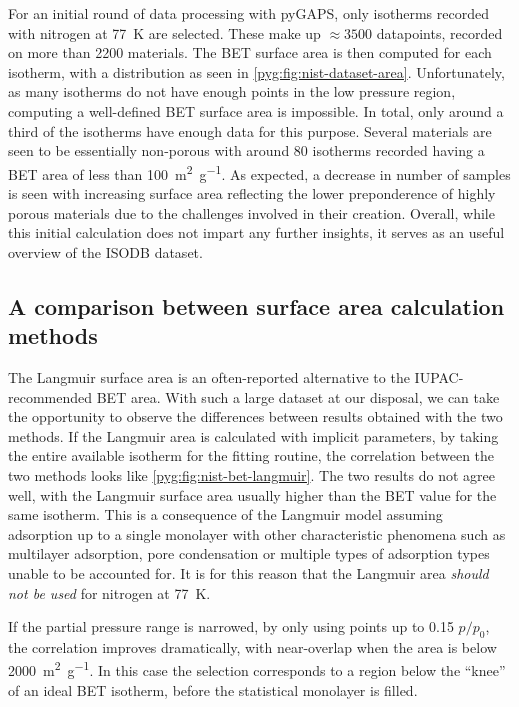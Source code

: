 For an initial round of data processing with pyGAPS,
only isotherms recorded with nitrogen at \SI{77}{\kelvin}
are selected. These make up \(\approx \! 3500\) datapoints,
recorded on more than 2200 materials. The \gls{BET} surface area
is then computed for each isotherm, with a distribution
as seen in \autoref{pyg:fig:nist-dataset-area}.
Unfortunately, as many isotherms do not have enough points
in the low pressure region, computing a well-defined
\gls{BET} surface area is impossible. In total, only around a
third of the isotherms have enough data for this purpose.
Several materials are seen to be essentially non-porous
with around 80 isotherms recorded having a \gls{BET} area of less
than \SI{100}{\metre^2\per\gram}. As expected, a decrease in
number of samples is seen with increasing surface area
reflecting the lower preponderence of highly porous
materials due to the challenges involved in their
creation. Overall, while this initial calculation does
not impart any further insights, it serves as an useful overview
of the ISODB dataset.

\subsection{A comparison between surface area calculation methods}

The Langmuir surface area is an often-reported alternative
to the IUPAC-recommended \gls{BET} area.
With such a large dataset at our disposal, we can take
the opportunity to observe the differences between results
obtained with the two methods.
If the Langmuir area is calculated with implicit parameters,
by taking the entire available isotherm for the fitting
routine, the correlation between the two methods looks
like \autoref{pyg:fig:nist-bet-langmuir}. The two results
do not agree well, with the Langmuir surface
area usually higher than the \gls{BET} value for the
same isotherm. This is a consequence of the Langmuir model
assuming adsorption up to a single monolayer with other
characteristic phenomena such as multilayer adsorption,
pore condensation or multiple types of adsorption types
unable to be accounted for. It is for this reason that the 
Langmuir area \textit{should not be used} for
nitrogen at \SI{77}{\kelvin}.

If the partial pressure range is narrowed, by only using
points up to 0.15 \(p/p_0\), the correlation improves
dramatically, with near-overlap when the area is below
\SI{2000}{\metre^2\per\gram}. In this case the selection corresponds
to a region below the ``knee'' of an ideal \gls{BET} isotherm,
before the statistical monolayer is filled.

